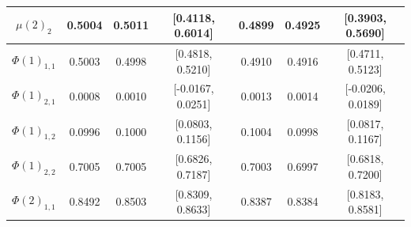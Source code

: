 \documentclass[11pt]{article}
\begin{document}
\begin{landscape}
\begin{table}
\begin{tabular}{|c | c c c | c c c |}
\hline                                                                                                                                                                                                       
$\mu(2)_2$ & 0.5004 & 0.5011 & [0.4118, 0.6014] & 0.4899 & 0.4925 & [0.3903, 0.5690] \\                                                                                                                        
\hline                                                                                                                                                                                                       
$\Phi(1)_{1,1}$ & 0.5003 & 0.4998 & [0.4818, 0.5210] & 0.4910 & 0.4916 & [0.4711, 0.5123] \\                                                                                                                   
\hline                                                                                                                                                                                                       
$\Phi(1)_{2,1}$ & 0.0008 & 0.0010 & [-0.0167, 0.0251] & 0.0013 & 0.0014 & [-0.0206, 0.0189] \\                                                                                                                 
\hline                                                                                                                                                                                                       
$\Phi(1)_{1,2}$ & 0.0996 & 0.1000 & [0.0803, 0.1156] & 0.1004 & 0.0998 & [0.0817, 0.1167] \\                                                                                                                   
\hline                                                                                                                                                                                                       
$\Phi(1)_{2,2}$ & 0.7005 & 0.7005 & [0.6826, 0.7187] & 0.7003 & 0.6997 & [0.6818, 0.7200] \\                                                                                                                   
\hline                                                                                                                                                                                                       
$\Phi(2)_{1,1}$ & 0.8492 & 0.8503 & [0.8309, 0.8633] & 0.8387 & 0.8384 & [0.8183, 0.8581] \\                                                                                                                   

\end{tabular}
\end{table}
\end{landscape}
\end{document}
